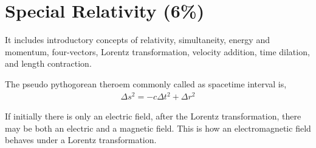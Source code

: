 
\section{Special Relativity (6\%)}

It includes introductory concepts of relativity, simultaneity, energy and momentum, four-vectors, Lorentz transformation, velocity addition, time dilation, and length contraction.


The pseudo pythogorean theroem commonly called as spacetime interval is,
\begin{align}
\Delta s^{2} = -c\Delta t^{2} + \Delta r^{2}
\end{align}

If initially there is only an electric field, after the Lorentz transformation, there may be both an electric and a magnetic field. This is how an electromagnetic field behaves under a Lorentz transformation.